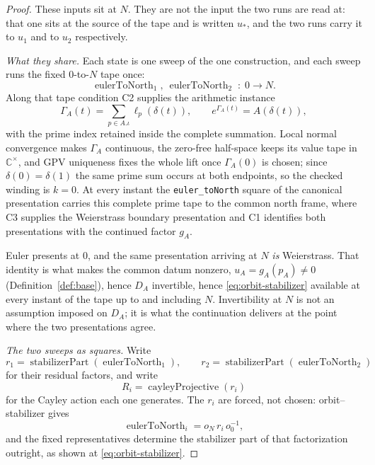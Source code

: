 \documentclass[11pt]{article}
\newcommand{\CC}{\mathbb{C}}
\theoremstyle{plain}
\theoremstyle{definition}
\theoremstyle{remark}
\begin{document}
\begin{proof}
These inputs sit at $N$. They are not the input the two runs are read at: that
one sits at the source of the tape and is written $u_\ast$, and the two runs
carry it to $u_1$ and to $u_2$ respectively.

\medskip
\noindent\emph{What they share.}
Each state is one sweep of the one construction, and each sweep runs the fixed
$0$-to-$N$ tape once:
\[
  \operatorname{eulerToNorth}_1,\ \operatorname{eulerToNorth}_2
    \;:\;0\longrightarrow N .
\]
Along that tape condition \textup{C2} supplies the arithmetic instance
\[
  \Gamma_A(t)=\sum_{p\in A.\iota}\ell_p(\delta(t)),
  \qquad e^{\Gamma_A(t)}=A(\delta(t)),
\]
with the prime index retained inside the complete
summation. Local normal convergence makes $\Gamma_A$ continuous, the zero-free
half-space keeps its value tape in $\CC^\times$, and GPV uniqueness fixes the
whole lift once $\Gamma_A(0)$ is chosen; since $\delta(0)=\delta(1)$ the same
prime sum occurs at both endpoints, so the checked winding is $k=0$. At every
instant the \texttt{euler\_toNorth} square of the canonical presentation
carries this complete prime tape to the common north frame, where \textup{C3}
supplies the Weierstrass boundary presentation and \textup{C1} identifies both
presentations with the continued factor $g_A$.

Euler presents at $0$, and the same
presentation arriving at $N$ \emph{is} Weierstrass. That identity is what makes
the common datum nonzero, $u_A=g_A(p_A)\neq0$
\textup{(}Definition~\ref{def:base}\textup{)}, hence $D_A$ invertible, hence
\eqref{eq:orbit-stabilizer} available at every instant of the tape up to and
including $N$. Invertibility at $N$ is not an assumption imposed on $D_A$; it is
what the continuation delivers at the point where the two presentations agree.

\medskip
\noindent\emph{The two sweeps as squares.}
Write
\[
  r_1=\operatorname{stabilizerPart}(\operatorname{eulerToNorth}_1),\qquad
  r_2=\operatorname{stabilizerPart}(\operatorname{eulerToNorth}_2)
\]
for their residual factors, and write
\[
  R_i=\operatorname{cayleyProjective}(r_i)
\]
for the Cayley action each one generates. The $r_i$ are forced, not chosen:
orbit--stabilizer gives
\[
  \operatorname{eulerToNorth}_i=o_N\,r_i\,o_0^{-1},
\]
and the fixed representatives determine the stabilizer part of that
factorization outright, as shown at \eqref{eq:orbit-stabilizer}.


\end{proof}
\end{document}

